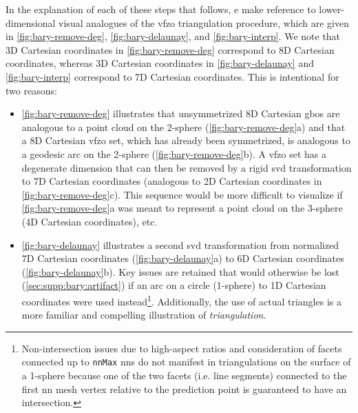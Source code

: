 \documentclass[final,twocolumn,12pt]{elsarticle}
\newcommand{\matlab}[1]{\mbox{\lstinline[style=Matlab-editor]{#1}}}
\newcommand{\outpt}{prediction}
\begin{document}
\begin{appendices}
In the explanation of each of these steps that follows, e make reference to lower-dimensional visual analogues of the \gls{vfzo} triangulation procedure, which are given in \cref{fig:bary-remove-deg}, \cref{fig:bary-delaunay}, and \cref{fig:bary-interp}. We note that 3D Cartesian coordinates in \cref{fig:bary-remove-deg} correspond to 8D Cartesian coordinates, whereas 3D Cartesian coordinates in \cref{fig:bary-delaunay} and \cref{fig:bary-interp} correspond to 7D Cartesian coordinates. This is intentional for two reasons:
\begin{itemize}
    \item \cref{fig:bary-remove-deg} illustrates that unsymmetrized 8D Cartesian \glspl{gbo} are analogous to a point cloud on the 2-sphere (\cref{fig:bary-remove-deg}a) and that a 8D Cartesian \gls{vfzo} set, which has already been symmetrized, is analogous to a geodesic arc on the 2-sphere (\cref{fig:bary-remove-deg}b). A \gls{vfzo} set has a degenerate dimension that can then be removed by a rigid \gls{svd} transformation to 7D Cartesian coordinates (analogous to 2D Cartesian coordinates in \cref{fig:bary-remove-deg}c). This sequence would be more difficult to visualize if \cref{fig:bary-remove-deg}a was meant to represent a point cloud on the 3-sphere (4D Cartesian coordinates), etc.
    \item \cref{fig:bary-delaunay} illustrates a second \gls{svd} transformation from normalized 7D Cartesian coordinates (\cref{fig:bary-delaunay}a) to 6D Cartesian coordinates (\cref{fig:bary-delaunay}b). Key issues are retained that would otherwise be lost (\cref{sec:supp:bary:artifact}) if an arc on a circle (1-sphere) to 1D Cartesian coordinates were used instead\footnote{Non-intersection issues due to high-aspect ratios and consideration of facets connected up to \matlab{nnMax} \glspl{nn} do not manifest in triangulations on the surface of a 1-sphere because one of the two facets (i.e. line segments) connected to the first \gls{nn} mesh vertex relative to the \outpt{} point is guaranteed to have an intersection.}. Additionally, the use of actual triangles is a more familiar and compelling illustration of \textit{triangulation}.
\end{itemize}


\end{appendices}
\end{document}
